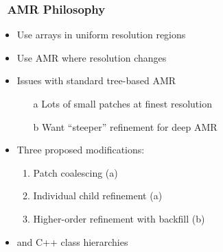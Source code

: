 \begin{frame}[fragile] \frametitle{\cello\ AMR Philosophy}
\begin{itemize}
\item Use arrays in uniform resolution regions
\item Use AMR where resolution changes
\item Issues with standard tree-based AMR
\begin{itemize}
\item[a] Lots of small patches at finest resolution
\item[b] Want ``steeper'' refinement for deep AMR
\end{itemize}
\item Three proposed modifications:
\begin{enumerate}
\item Patch coalescing (a)
\item Individual child refinement (a)
\item Higher-order refinement with backfill (b)
\end{enumerate}
\item {} and  C++ class hierarchies
\end{itemize}
\end{frame}



